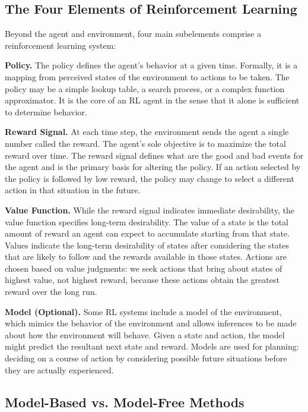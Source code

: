 \documentclass[12pt]{article}
\begin{document}
\subsection{The Four Elements of Reinforcement Learning}

Beyond the agent and environment, four main subelements comprise a reinforcement learning system:

\textbf{Policy.} The policy defines the agent's behavior at a given time. Formally, it is a mapping from perceived states of the environment to actions to be taken. The policy may be a simple lookup table, a search process, or a complex function approximator. It is the core of an RL agent in the sense that it alone is sufficient to determine behavior.

\textbf{Reward Signal.} At each time step, the environment sends the agent a single number called the reward. The agent's sole objective is to maximize the total reward over time. The reward signal defines what are the good and bad events for the agent and is the primary basis for altering the policy. If an action selected by the policy is followed by low reward, the policy may change to select a different action in that situation in the future.

\textbf{Value Function.} While the reward signal indicates immediate desirability, the value function specifies long-term desirability. The value of a state is the total amount of reward an agent can expect to accumulate starting from that state. Values indicate the long-term desirability of states after considering the states that are likely to follow and the rewards available in those states. Actions are chosen based on value judgments: we seek actions that bring about states of highest value, not highest reward, because these actions obtain the greatest reward over the long run.

\textbf{Model (Optional).} Some RL systems include a model of the environment, which mimics the behavior of the environment and allows inferences to be made about how the environment will behave. Given a state and action, the model might predict the resultant next state and reward. Models are used for planning: deciding on a course of action by considering possible future situations before they are actually experienced.

\subsection{Model-Based vs. Model-Free Methods}
\end{document}
